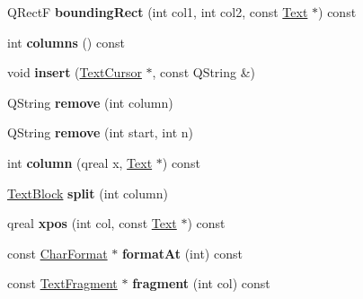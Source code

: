 \begin{DoxyCompactItemize}
Q\+RectF {\bfseries bounding\+Rect} (int col1, int col2, const \hyperlink{class_ms_1_1_text}{Text} $\ast$) const
\item 
\mbox{\label{class_ms_1_1_text_block_a8f8903f1526759267ef0fd080cd10deb}} 
int {\bfseries columns} () const
\item 
\mbox{\label{class_ms_1_1_text_block_abf1ca4bdc396cf5da259718e65520469}} 
void {\bfseries insert} (\hyperlink{class_ms_1_1_text_cursor}{Text\+Cursor} $\ast$, const Q\+String \&)
\item 
\mbox{\label{class_ms_1_1_text_block_a7a31205bb9b88e60897378459bf89dc4}} 
Q\+String {\bfseries remove} (int column)
\item 
\mbox{\label{class_ms_1_1_text_block_a3e33a9c89d9552fa024a1e861dc0a9c7}} 
Q\+String {\bfseries remove} (int start, int n)
\item 
\mbox{\label{class_ms_1_1_text_block_a5a6b27df6ba9355238f514b59b75faf6}} 
int {\bfseries column} (qreal x, \hyperlink{class_ms_1_1_text}{Text} $\ast$) const
\item 
\mbox{\label{class_ms_1_1_text_block_a32e4a523065779c7e816d69eb153bb87}} 
\hyperlink{class_ms_1_1_text_block}{Text\+Block} {\bfseries split} (int column)
\item 
\mbox{\label{class_ms_1_1_text_block_aa75845abfbc22414b0b5635f4ce83704}} 
qreal {\bfseries xpos} (int col, const \hyperlink{class_ms_1_1_text}{Text} $\ast$) const
\item 
\mbox{\label{class_ms_1_1_text_block_acc6aa35e8bb62c4fd0768048ca517936}} 
const \hyperlink{class_ms_1_1_char_format}{Char\+Format} $\ast$ {\bfseries format\+At} (int) const
\item 
\mbox{\label{class_ms_1_1_text_block_a5372818da86c595af20e76fceedf8a05}} 
const \hyperlink{class_ms_1_1_text_fragment}{Text\+Fragment} $\ast$ {\bfseries fragment} (int col) const
\item 
\mbox{\label{class_ms_1_1_text_block_a2febc986d7d93a23b0134129901798ae}} 

\end{DoxyCompactItemize}
